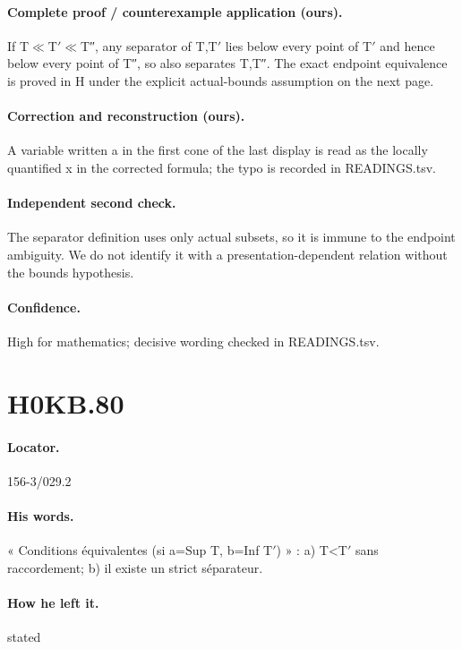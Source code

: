 \paragraph{Complete proof / counterexample application (ours).} If T\ensuremath{\ll}T\ensuremath{\prime}\ensuremath{\ll}T″, any separator of T,T\ensuremath{\prime} lies below every point of T\ensuremath{\prime} and hence below every point of T″, so also separates T,T″. The exact endpoint equivalence is proved in H under the explicit actual-bounds assumption on the next page.

\paragraph{Correction and reconstruction (ours).} A variable written a in the first cone of the last display is read as the locally quantified x in the corrected formula; the typo is recorded in READINGS.tsv.

\paragraph{Independent second check.} The separator definition uses only actual subsets, so it is immune to the endpoint ambiguity. We do not identify it with a presentation-dependent relation without the bounds hypothesis.

\paragraph{Confidence.} High for mathematics; decisive wording checked in READINGS.tsv.

\section*{H0KB.80}\label{statement:H0KB.80}
\paragraph{Locator.} 156-3/029.2

\paragraph{His words.} « Conditions équivalentes (si a=Sup T, b=Inf T\ensuremath{\prime}) » : a) T<T\ensuremath{\prime} sans raccordement; b) il existe un strict séparateur.

\paragraph{How he left it.} stated

